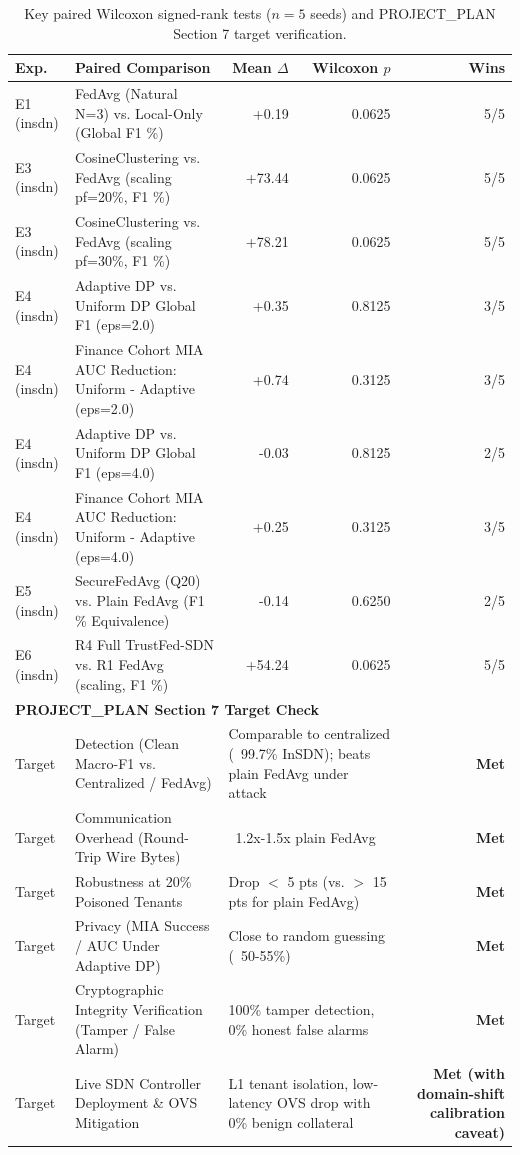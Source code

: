 \begin{table}[t]
\centering
\caption{Key paired Wilcoxon signed-rank tests ($n=5$ seeds) and PROJECT\_PLAN Section 7 target verification.}
\label{tab:stats_targets}
\begin{tabular}{llrrr}
\toprule
Exp. & Paired Comparison & Mean $\Delta$ & Wilcoxon $p$ & Wins \\
\midrule
E1 (insdn) & FedAvg (Natural N=3) vs. Local-Only (Global F1 \%) & +0.19 & 0.0625 & 5/5 \\
E3 (insdn) & CosineClustering vs. FedAvg (scaling pf=20\%, F1 \%) & +73.44 & 0.0625 & 5/5 \\
E3 (insdn) & CosineClustering vs. FedAvg (scaling pf=30\%, F1 \%) & +78.21 & 0.0625 & 5/5 \\
E4 (insdn) & Adaptive DP vs. Uniform DP Global F1 (eps=2.0) & +0.35 & 0.8125 & 3/5 \\
E4 (insdn) & Finance Cohort MIA AUC Reduction: Uniform - Adaptive (eps=2.0) & +0.74 & 0.3125 & 3/5 \\
E4 (insdn) & Adaptive DP vs. Uniform DP Global F1 (eps=4.0) & -0.03 & 0.8125 & 2/5 \\
E4 (insdn) & Finance Cohort MIA AUC Reduction: Uniform - Adaptive (eps=4.0) & +0.25 & 0.3125 & 3/5 \\
E5 (insdn) & SecureFedAvg (Q20) vs. Plain FedAvg (F1 \% Equivalence) & -0.14 & 0.6250 & 2/5 \\
E6 (insdn) & R4 Full TrustFed-SDN vs. R1 FedAvg (scaling, F1 \%) & +54.24 & 0.0625 & 5/5 \\
\midrule
\multicolumn{5}{l}{\textbf{PROJECT\_PLAN Section 7 Target Check}} \\
Target & Detection (Clean Macro-F1 vs. Centralized / FedAvg) & \multicolumn{2}{l}{Comparable to centralized (~99.7\% InSDN); beats plain FedAvg under attack} & \textbf{Met} \\
Target & Communication Overhead (Round-Trip Wire Bytes) & \multicolumn{2}{l}{~1.2x-1.5x plain FedAvg} & \textbf{Met} \\
Target & Robustness at 20\% Poisoned Tenants & \multicolumn{2}{l}{Drop $<$ 5 pts (vs. $>$ 15 pts for plain FedAvg)} & \textbf{Met} \\
Target & Privacy (MIA Success / AUC Under Adaptive DP) & \multicolumn{2}{l}{Close to random guessing (~50-55\%)} & \textbf{Met} \\
Target & Cryptographic Integrity Verification (Tamper / False Alarm) & \multicolumn{2}{l}{100\% tamper detection, 0\% honest false alarms} & \textbf{Met} \\
Target & Live SDN Controller Deployment \& OVS Mitigation & \multicolumn{2}{l}{L1 tenant isolation, low-latency OVS drop with 0\% benign collateral} & \textbf{Met (with domain-shift calibration caveat)} \\
\bottomrule
\end{tabular}
\end{table}
